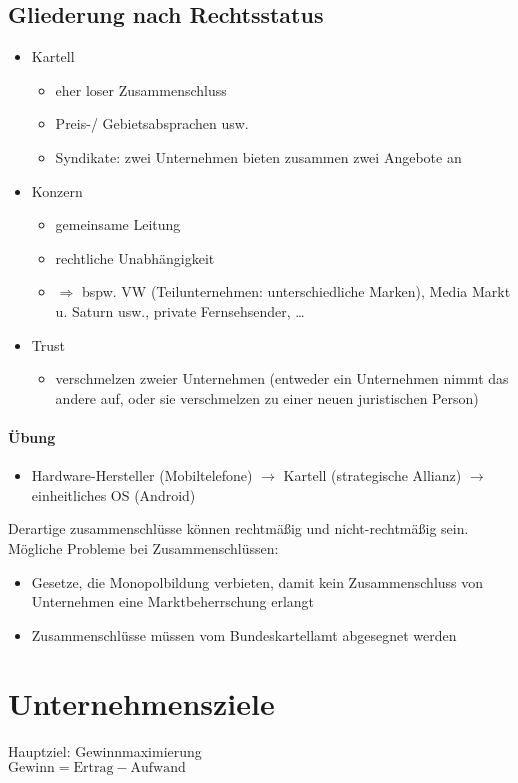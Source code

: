 \subsection{Gliederung nach Rechtsstatus}
\begin{itemize}
\item Kartell
\begin{itemize}
\item eher loser Zusammenschluss
\item Preis-/ Gebietsabsprachen usw.
\item Syndikate: zwei Unternehmen bieten zusammen zwei Angebote an
\end{itemize}
\item Konzern
\begin{itemize}
\item gemeinsame Leitung
\item rechtliche Unabhängigkeit
\item $\Rightarrow$ bspw. VW (Teilunternehmen: unterschiedliche Marken), Media Markt u. Saturn usw.,  private Fernsehsender, …
\end{itemize}
\item Trust
\begin{itemize}
\item verschmelzen zweier Unternehmen (entweder ein Unternehmen nimmt das andere auf, oder sie verschmelzen zu einer neuen juristischen Person)
\end{itemize}
\end{itemize}
\paragraph{Übung} 
\begin{itemize}
\item Hardware-Hersteller (Mobiltelefone) $\to$ Kartell (strategische Allianz) $\to$ einheitliches OS (Android)
\end{itemize}
Derartige zusammenschlüsse können rechtmäßig und nicht-rechtmäßig sein.
Mögliche Probleme bei Zusammenschlüssen:
\begin{itemize}
\item Gesetze, die Monopolbildung verbieten, damit kein Zusammenschluss von Unternehmen eine Marktbeherrschung erlangt
\item Zusammenschlüsse müssen vom Bundeskartellamt abgesegnet werden
\end{itemize}

\section{Unternehmensziele}
Hauptziel: Gewinnmaximierung\\
$\text{Gewinn} = \text{Ertrag} - \text{Aufwand}$
